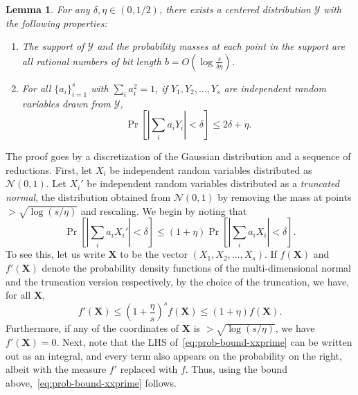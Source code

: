 \documentclass[11pt]{article}
\makeatletter
\theoremstyle{plain}
\newtheorem{lemma}[theorem]{Lemma}
\theoremstyle{plain}
\theoremstyle{definition}
\theoremstyle{plain}
\theoremstyle{remark}
\newenvironment{proof}[1][\protect\proofname]{\par
	\normalfont\topsep6\p@\@plus6\p@\relax
	\trivlist
	\itemindent\parindent
	\item[\hskip\labelsep\scshape #1]\ignorespaces
}{\endtrivlist\@endpefalse
}
\providecommand{\proofname}{Proof}
\newcommand{\cN}{\mathcal{N}}
\newcommand{\cY}{\mathcal{Y}}
\makeatother
\begin{document}
\begin{lemma} For any $\delta, \eta \in (0, 1/2)$, there exists a centered distribution $\cY$ with the following properties:
\begin{enumerate}
\item The support of $\cY$ and the probability masses at each point in the support are all rational numbers of bit length $b = O(\log \frac{s}{\delta \eta} )$.
\item For all $\{a_i\}_{i=1}^s$ with $\sum_i a_i^2 = 1$, if $Y_1, Y_2, \dots, Y_s$ are independent random variables drawn from $\cY$, 
\[ \Pr[ |\sum_i a_i Y_i | < \delta ] \le 2\delta + \eta. \]
\end{enumerate}
\end{lemma} 
\begin{proof}
The proof goes by a discretization of the Gaussian distribution and a sequence of reductions. First, let $X_i$ be independent random variables distributed as $\cN(0,1)$.  Let $X_i'$ be independent random variables distributed as a \emph{truncated normal}, the distribution obtained from $\cN(0,1)$ by removing the mass at points $> \sqrt{\log( s/\eta)}$ and rescaling. We begin by noting that
\begin{equation}\label{eq:prob-bound-xxprime}
\Pr[ | \sum_i  a_i X_i' | < \delta ] \le \left( 1+\eta  \right) \Pr[ |\sum_i a_i X_i | < \delta ].
\end{equation}
To see this, let us write $\bm{X}$ to be the vector $(X_1, X_2, \dots, X_s)$. If $f(\bm{X})$ and $f'(\bm{X})$ denote the probability density functions of the multi-dimensional normal and the truncation version respectively, by the choice of the truncation, we have, for all $\bm{X}$,
\[ f' (\bm{X} ) \le \left( 1+\frac{\eta}{s} \right)^s f( \bm{X} ) \le (1+\eta) f(\bm{X}). \]
Furthermore, if any of the coordinates of $\bm{X}$ is $> \sqrt{\log (s/\eta) }$, we have $f' (\bm{X} ) = 0$. 
Next, note that the LHS of~\eqref{eq:prob-bound-xxprime} can be written out as an integral, and every term also appears on the probability on the right, albeit with the measure $f'$ replaced with $f$. Thus, using the bound above,~\eqref{eq:prob-bound-xxprime} follows.


\end{proof}
\end{document}
